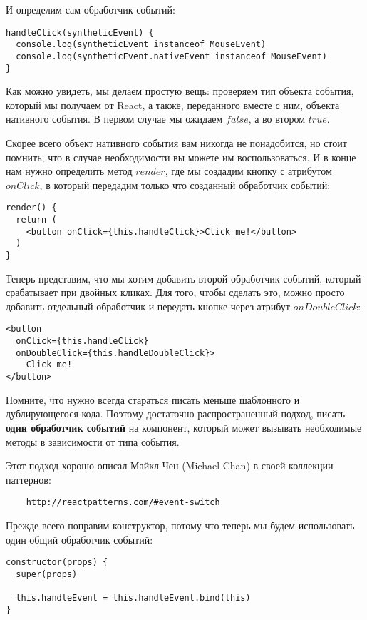 И определим сам обработчик событий:

\begin{lstlisting}
handleClick(syntheticEvent) {
  console.log(syntheticEvent instanceof MouseEvent)
  console.log(syntheticEvent.nativeEvent instanceof MouseEvent)
}
\end{lstlisting}

Как можно увидеть, мы делаем простую вещь: проверяем тип объекта события, который мы получаем от React, а также, переданного вместе с ним, объекта нативного события. В первом случае мы ожидаем $false$, а во втором $true$.

Скорее всего объект нативного события вам никогда не понадобится, но стоит помнить, что в случае необходимости вы можете им воспользоваться. И в конце нам нужно определить метод $render$, где мы создадим кнопку с атрибутом $onClick$, в который передадим только что созданный обработчик событий:

\begin{lstlisting}
render() {
  return (
    <button onClick={this.handleClick}>Click me!</button>
  )
}
\end{lstlisting}

Теперь представим, что мы хотим добавить второй обработчик событий, который срабатывает при двойных кликах. Для того, чтобы сделать это, можно просто добавить отдельный обработчик и передать кнопке через атрибут $onDoubleClick$:

\begin{lstlisting}
<button
  onClick={this.handleClick}
  onDoubleClick={this.handleDoubleClick}>
    Click me!
</button>
\end{lstlisting} 

Помните, что нужно всегда стараться писать меньше шаблонного и дублирующегося кода. Поэтому достаточно распространенный подход, писать \textbf{один обработчик событий} на компонент, который может вызывать необходимые методы в зависимости от типа события.

Этот подход хорошо описал Майкл Чен (Michael Chan) в своей коллекции паттернов:

\begin{lstlisting}
	http://reactpatterns.com/#event-switch
\end{lstlisting}

Прежде всего поправим конструктор, потому что теперь мы будем использовать один общий обработчик событий:

\begin{lstlisting}
constructor(props) {
  super(props)
     
  this.handleEvent = this.handleEvent.bind(this)
}
\end{lstlisting}

